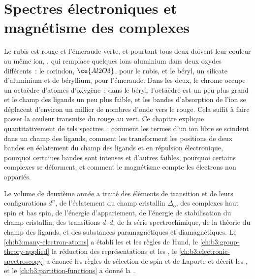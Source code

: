 \chapter{Spectres électroniques et magnétisme des complexes}\label{ch:b3:complex-spectra-magnetism}

Le rubis est rouge et l'émeraude verte, et pourtant tous deux doivent leur
couleur au même ion, , qui remplace quelques ions aluminium dans
deux oxydes différents~: le corindon,
$\ce{Al2O3}$, pour le rubis, et le béryl, un silicate d'aluminium et de
béryllium, pour l'émeraude. Dans les deux, le chrome occupe un octaèdre
d'atomes d'oxygène~; dans le béryl, l'octaèdre est un peu plus grand et le
champ des ligands un peu plus faible, et les bandes d'absorption de l'ion se
déplacent d'environ un millier de nombres d'onde vers le rouge. Cela suffit à
faire passer la couleur transmise du rouge au vert. Ce chapitre explique
quantitativement de tels spectres~: comment les termes d'un ion libre se
scindent dans un champ des ligands, comment les  transforment les positions de deux bandes en éclatement du
champ des ligands et en répulsion électronique, pourquoi certaines bandes
sont intenses et d'autres faibles, pourquoi certains complexes se
déforment, et comment le magnétisme compte les électrons non appariés.

\begin{recall}
Le volume de deuxième année a traité des éléments de transition et de leurs
configurations $d^n$, de l'éclatement du champ cristallin $\Delta_{\mathrm o}$, des complexes
haut spin et bas spin, de l'énergie d'appariement, de l'énergie de
stabilisation du champ cristallin, des transitions $d$--$d$, de la série
spectrochimique, de la théorie du champ des ligands, et des substances
paramagnétiques et diamagnétiques. Le \cref{ch:b3:many-electron-atoms} a
établi les  et les règles de Hund, le
\cref{ch:b3:group-theory-applied} la réduction des représentations et les
, le \cref{ch:b3:electronic-spectroscopy} a énoncé les
règles de sélection de spin et de Laporte et décrit les , et le \cref{ch:b3:partition-functions} a donné la
.
\end{recall}

